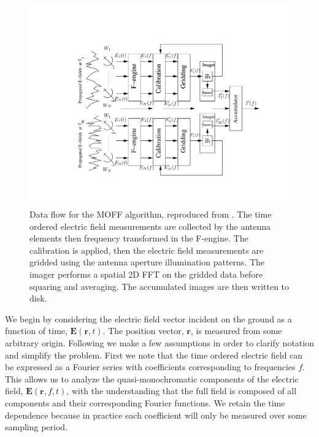 \documentclass[a4paper,fleqn,usenatbib]{mnras}
\begin{document}
\begin{figure}
\begin{center}
\includegraphics[width=\columnwidth]{fig1.pdf}
\caption{Data flow for the MOFF algorithm, reproduced from \citealt{thy15c}. The time ordered 
electric field measurements are collected by the antenna elements then frequency transformed in the 
F-engine. The calibration is applied, then the electric field measurements are gridded using the 
antenna aperture illumination patterns. The imager performs a spatial 2D FFT on the gridded data before 
squaring and averaging. The accumulated images are then written to disk.}
\label{fig:moff_flow}
\end{center}
\end{figure}

We begin by considering the electric field vector incident on the ground as a function of time, 
$\mathbf{E}(\mathbf{r},t)$. The position vector, $\mathbf{r}$, is measured from some arbitrary 
origin. Following \citealt{cla99} we make a few assumptions in order to clarify notation and 
simplify the problem. First we note that the time ordered electric field can be expressed as a 
Fourier series with coefficients corresponding to frequencies $f$. This allows us to analyze the 
quasi-monochromatic components of the electric field, $\mathbf{E}(\mathbf{r},f,t)$, with the 
understanding that the full field is composed of all components and their corresponding Fourier 
functions. We retain the time dependence because in practice each coefficient will only be 
measured over some sampling period. 
\end{document}
